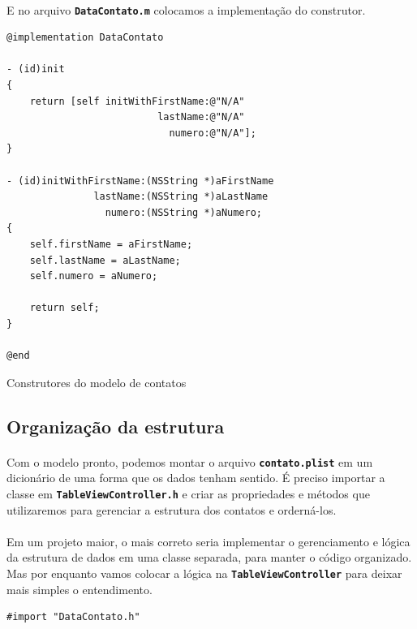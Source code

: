 \documentclass[a4paper,12pt,brazil,doubleside]{book}
\begin{document}
\begin{singlespace}
\paragraph{}E no arquivo \texttt{\textbf{DataContato.m}} colocamos a implementação do construtor.

\begin{listing}[H]
\begin{verbatim}
@implementation DataContato

- (id)init
{
    return [self initWithFirstName:@"N/A"
                          lastName:@"N/A"
                            numero:@"N/A"];
}

- (id)initWithFirstName:(NSString *)aFirstName
               lastName:(NSString *)aLastName
                 numero:(NSString *)aNumero;
{    
    self.firstName = aFirstName;
    self.lastName = aLastName;
    self.numero = aNumero;
    
    return self;
}

@end
\end{verbatim}
\caption{Construtores do modelo de contatos}
\end{listing}

\subsection{Organização da estrutura}

\paragraph{}Com o modelo pronto, podemos montar o arquivo \texttt{\textbf{contato.plist}} em um dicionário de uma forma que os dados tenham sentido. É preciso importar a classe em \texttt{\textbf{TableViewController.h}} e criar as propriedades e métodos que utilizaremos para gerenciar a estrutura dos contatos e orderná-los.
\paragraph{}Em um projeto maior, o mais correto seria implementar o gerenciamento e lógica da estrutura de dados em uma classe separada, para manter o código organizado. Mas por enquanto vamos colocar a lógica na \texttt{\textbf{TableViewController}} para deixar mais simples o entendimento.

\begin{listing}[H]
\begin{verbatim}
#import "DataContato.h"


\end{verbatim}
\end{listing}
\end{singlespace}
\end{document}
